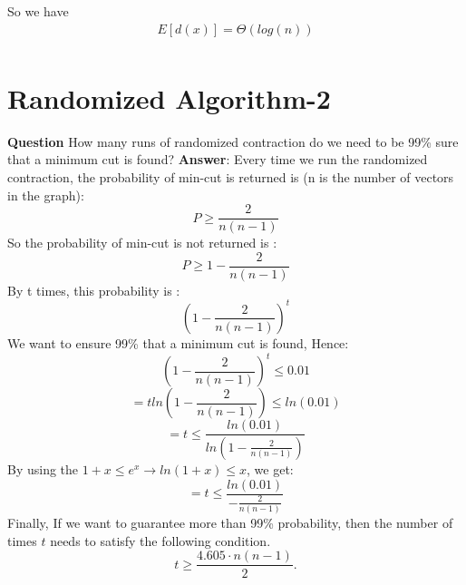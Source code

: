 \documentclass[12pt]{article}
\begin{document}
So we have
\begin{equation}
\begin{aligned}
E[d(x)] = \Theta(log(n))\\
\end{aligned}
\end{equation}


\section{Randomized Algorithm-2}
\textbf{Question}
How many runs of randomized contraction do we need to be 99\% sure that a minimum cut is found?
\textbf{Answer}:
Every time we run the randomized contraction, the probability of min-cut is returned is (n is the number of vectors in the graph):
\[P\geq\frac{2}{n(n-1)}\]
So the probability of min-cut is not returned is :
\[P\geq1-\frac{2}{n(n-1)}\]
By t times, this probability is :
\[(1-\frac{2}{n(n-1)})^t\]
We want to ensure 99\% that a minimum cut is found, Hence:
\[(1-\frac{2}{n(n-1)})^t\leq0.01\]
\[=tln(1-\frac{2}{n(n-1)})\leq ln(0.01)\]
\[=t\leq \frac{ln(0.01)}{ln(1-\frac{2}{n(n-1)})}\]
By using the \(1+x\leq e^x \rightarrow ln(1+x)\leq x\), we get:
\[=t\leq \frac{ln(0.01)}{-\frac{2}{n(n-1)}}\]
Finally, If we want to guarantee more than 99\% probability, then the number of times \(t\) needs to satisfy the following condition.
\[
t \geq \frac{4.605 \cdot n(n - 1)}{2}.
\]
\end{document}
